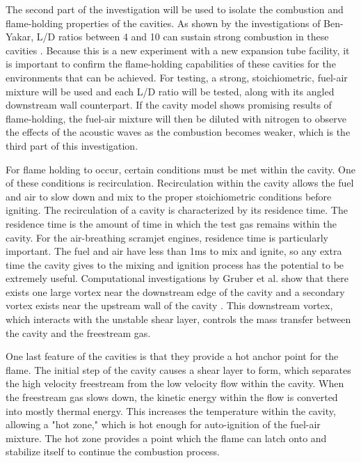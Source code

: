 The second part of the investigation will be used to isolate the combustion and flame-holding properties of the cavities. As shown by the investigations of Ben-Yakar, L/D ratios between 4 and 10 can sustain strong combustion in these cavities \cite{ben2001cavity}. Because this is a new experiment with a new expansion tube facility, it is important to confirm the flame-holding capabilities of these cavities for the environments that can be achieved. For testing, a strong, stoichiometric, fuel-air mixture will be used and each L/D ratio will be tested, along with its angled downstream wall counterpart. If the cavity model shows promising results of flame-holding, the fuel-air mixture will then be diluted with nitrogen to observe the effects of the acoustic waves as the combustion becomes weaker, which is the third part of this investigation. 

For flame holding to occur, certain conditions must be met within the cavity. One of these conditions is recirculation. Recirculation within the cavity allows the fuel and air to slow down and mix to the proper stoichiometric conditions before igniting. The recirculation of a cavity is characterized by its residence time. The residence time is the amount of time in which the test gas remains within the cavity. For the air-breathing scramjet engines, residence time is particularly important. The fuel and air have less than 1ms to mix and ignite, so any extra time the cavity gives to the mixing and ignition process has the potential to be extremely useful. Computational investigations by Gruber et al. show that there exists one large vortex near the downstream edge of the cavity and a secondary vortex exists near the upstream wall of the cavity \cite{gruber2001fundamental}. This downstream vortex, which interacts with the unstable shear layer, controls the mass transfer between the cavity and the freestream gas. 

One last feature of the cavities is that they provide a hot anchor point for the flame. The initial step of the cavity causes a shear layer to form, which separates the high velocity freestream from the low velocity flow within the cavity. When the freestream gas slows down, the kinetic energy within the flow is converted into mostly thermal energy. This increases the temperature within the cavity, allowing a "hot zone," which is hot enough for auto-ignition of the fuel-air mixture. The hot zone provides a point which the flame can latch onto and stabilize itself to continue the combustion process. 


